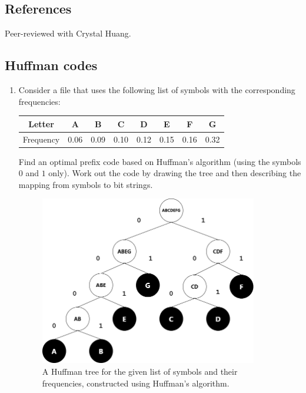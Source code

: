 \def\lc{\left\lceil}
\def\rc{\right\rceil}
\runningheadrule
\firstpageheadrule
\cfoot{}
\subsection*{References}
Peer-reviewed with Crystal Huang.
\subsection{Huffman codes}
\begin{enumerate}
\item 
Consider a file that uses the following list of symbols with the corresponding frequencies:
\begin{center}
\begin{tabular}{|c|c|c|c|c|c|c|c|}
\hline
     Letter & A & B & C & D & E & F & G\\
     \hline 
     Frequency & 0.06 & 0.09 & 0.10 & 0.12 & 0.15 & 0.16 & 0.32\\
     \hline
\end{tabular}
\end{center}

\noindent Find an optimal prefix code based on Huffman's algorithm (using the symbols $0$ and $1$ only). Work out the code by drawing the tree and then describing the mapping from symbols to bit strings.
\begin{figure}[h]
\centering
\includegraphics[width=9.5cm]{../images/hw7-1-1.png}
\caption{A Huffman tree for the given list of symbols and their frequencies, constructed using Huffman's algorithm.}
\label{fig:hw7_1_1}
\end{figure}


\end{enumerate}
